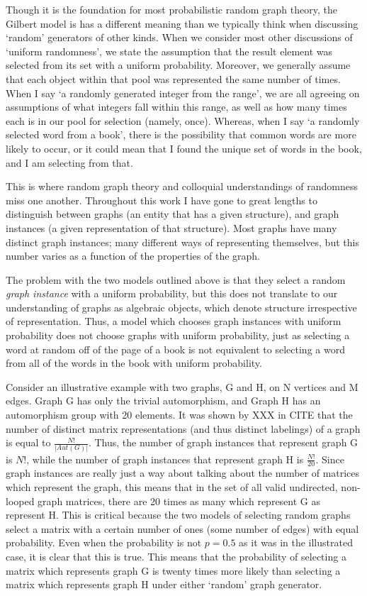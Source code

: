 \documentclass[11pt,a4paper]{report}
\begin{document}
Though it is the foundation for most probabilistic random graph theory, the Gilbert model is has a different meaning than we typically think when discussing `random' generators of other kinds.
When we consider most other discussions of `uniform randomness', we state the assumption that the result element was selected from its set with a uniform probability.
Moreover, we generally assume that each object within that pool was represented the same number of times.
When I say `a randomly generated integer from the range', we are all agreeing on assumptions of what integers fall within this range, as well as how many times each is in our pool for selection (namely, once). 
Whereas, when I say `a randomly selected word from a book', there is the possibility that common words are more likely to occur, or it could mean that I found the unique set of words in the book, and I am selecting from that.

This is where random graph theory and colloquial understandings of randomness miss one another.
Throughout this work I have gone to great lengths to distinguish between graphs (an entity that has a given structure), and graph instances (a given representation of that structure).
Most graphs have many distinct graph instances; many different ways of representing themselves, but this number varies as a function of the properties of the graph.

The problem with the two models outlined above is that they select a random \emph{graph instance} with a uniform probability, but this does not translate to our understanding of graphs as algebraic objects, which denote structure irrespective of representation.
Thus, a model which chooses graph instances with uniform probability does not choose graphs with uniform probability, just as selecting a word at random off of the page of a book is not equivalent to selecting a word from all of the words in the book with uniform probability.

Consider an illustrative example with two graphs, G and H, on N vertices and M edges.
Graph G has only the trivial automorphism, and Graph H has an automorphism group with 20 elements.
It was shown by XXX in CITE that the number of distinct matrix representations (and thus distinct labelings) of a graph is equal to $\frac{N!}{|Aut(G)|}$.
Thus, the number of graph instances that represent graph G is $N!$, while the number of graph instances that represent graph H is $\frac{N!}{20}$.
Since graph instances are really just a way about talking about the number of matrices which represent the graph, this means that in the set of all valid undirected, non-looped graph matrices, there are 20 times as many which represent G as represent H.
This is critical because the two models of selecting random graphs select a matrix with a certain number of ones (some number of edges) with equal probability.
Even when the probability is not $p=0.5$ as it was in the illustrated case, it is clear that this is true.
This means that the probability of selecting a matrix which represents graph G is twenty times more likely than selecting a matrix which represents graph H under either `random' graph generator.
\end{document}
